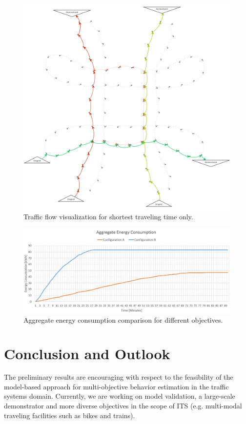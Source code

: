 \documentclass[conference]{../cls/IEEEtran}
\begin{document}
\begin{figure}[t!]
	\centering
	\includegraphics[width=\columnwidth]{../gfx/graph.png}
	\caption{Traffic flow visualization for shortest traveling time only.}
	\label{figure:graph}
\end{figure}

\begin{figure}[t!]
	\centering
	\includegraphics[width=\columnwidth]{../gfx/chart.png}
	\caption{Aggregate energy consumption comparison for different objectives.}
	\label{figure:chart}
\end{figure}

\section{Conclusion and Outlook}

The preliminary results are encouraging with respect to the feasibility of the model-based approach for multi-objective behavior estimation in the traffic systems domain. Currently, we are working on model validation, a large-scale demonstrator and more diverse objectives in the scope of ITS (e.g. multi-modal traveling facilities such as bikes and trains).



\end{document}
